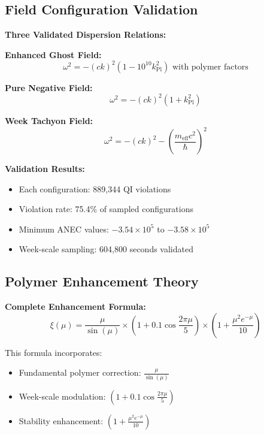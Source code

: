 \documentclass[11pt]{article}
\begin{document}
\subsection{Field Configuration Validation}

\textbf{Three Validated Dispersion Relations:}

\textbf{Enhanced Ghost Field:}
\begin{equation}
\omega^2 = -(ck)^2\left(1 - 10^{10} k_{\text{Pl}}^2\right) \text{ with polymer factors}
\end{equation}

\textbf{Pure Negative Field:}
\begin{equation}
\omega^2 = -(ck)^2(1 + k_{\text{Pl}}^2)
\end{equation}

\textbf{Week Tachyon Field:}
\begin{equation}
\omega^2 = -(ck)^2 - \left(\frac{m_{\text{eff}}c^2}{\hbar}\right)^2
\end{equation}

\textbf{Validation Results:}
\begin{itemize}
    \item Each configuration: 889,344 QI violations
    \item Violation rate: 75.4\% of sampled configurations
    \item Minimum ANEC values: $-3.54 \times 10^5$ to $-3.58 \times 10^5$
    \item Week-scale sampling: 604,800 seconds validated
\end{itemize}

\subsection{Polymer Enhancement Theory}

\textbf{Complete Enhancement Formula:}
\begin{equation}
\xi(\mu) = \frac{\mu}{\sin(\mu)} \times \left(1 + 0.1\cos\frac{2\pi\mu}{5}\right) \times \left(1 + \frac{\mu^2 e^{-\mu}}{10}\right)
\end{equation}

This formula incorporates:
\begin{itemize}
    \item Fundamental polymer correction: $\frac{\mu}{\sin(\mu)}$
    \item Week-scale modulation: $\left(1 + 0.1\cos\frac{2\pi\mu}{5}\right)$
    \item Stability enhancement: $\left(1 + \frac{\mu^2 e^{-\mu}}{10}\right)$
\end{itemize}
\end{document}
